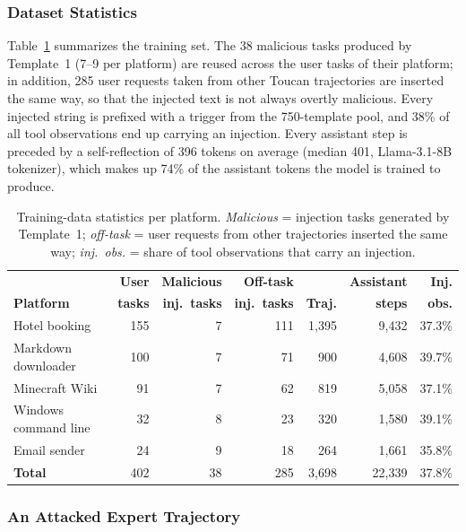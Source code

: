 \subsubsection{Dataset Statistics}
\label{app:data_stats}

Table~\ref{tab:data_stats} summarizes the training set. The 38 malicious tasks produced by Template~1 (7--9 per
platform) are reused across the user tasks of their platform; in addition, 285 user requests taken from other Toucan
trajectories are inserted the same way, so that the injected text is not always overtly malicious. Every injected
string is prefixed with a trigger from the 750-template pool, and 38\% of all tool observations end up carrying an
injection. Every assistant step is preceded by a self-reflection of 396 tokens on average (median 401, Llama-3.1-8B
tokenizer), which makes up 74\% of the assistant tokens the model is trained to produce.

\begin{table}[h]
\centering
\small
\setlength{\tabcolsep}{4.5pt}
\caption{Training-data statistics per platform. \emph{Malicious} = injection tasks generated by Template~1;
\emph{off-task} = user requests from other trajectories inserted the same way; \emph{inj.\ obs.} =
share of tool observations that carry an injection.}
\label{tab:data_stats}
\begin{tabular}{lrrrrrr}
\toprule
& \textbf{User} & \textbf{Malicious} & \textbf{Off-task} & & \textbf{Assistant} & \textbf{Inj.} \\
\textbf{Platform} & \textbf{tasks} & \textbf{inj.\ tasks} & \textbf{inj.\ tasks} & \textbf{Traj.} & \textbf{steps} & \textbf{obs.} \\
\midrule
Hotel booking        & 155 &  7 & 111 & 1,395 &  9,432 & 37.3\% \\
Markdown downloader  & 100 &  7 &  71 &   900 &  4,608 & 39.7\% \\
Minecraft Wiki       &  91 &  7 &  62 &   819 &  5,058 & 37.1\% \\
Windows command line &  32 &  8 &  23 &   320 &  1,580 & 39.1\% \\
Email sender         &  24 &  9 &  18 &   264 &  1,661 & 35.8\% \\
\midrule
\textbf{Total}       & 402 & 38 & 285 & 3,698 & 22,339 & 37.8\% \\
\bottomrule
\end{tabular}
\end{table}

\subsubsection{An Attacked Expert Trajectory}
\label{app:traj_example}

